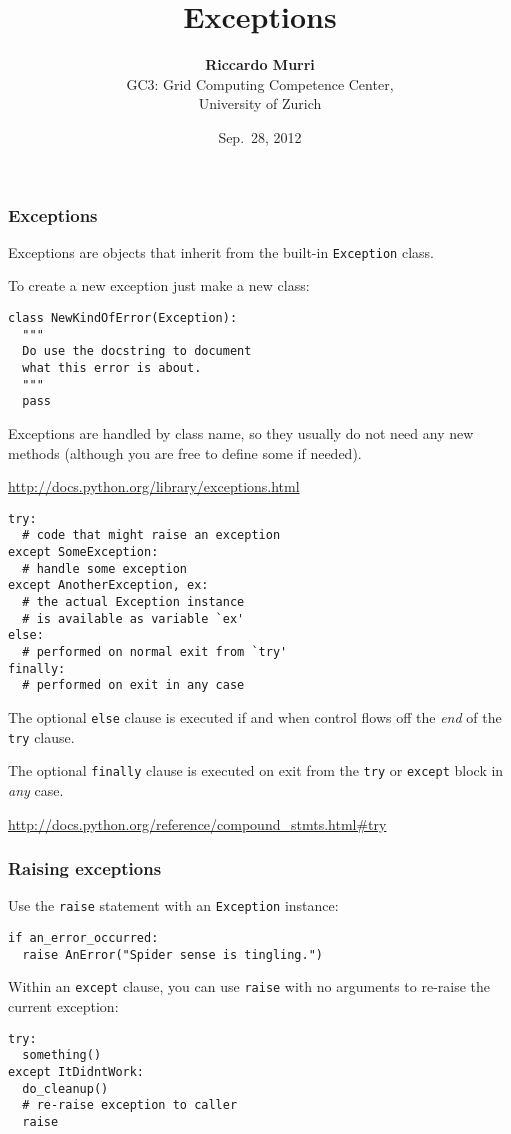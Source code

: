 \documentclass[english,serif,mathserif,xcolor=pdftex,dvipsnames,table]{beamer}
\title[Part 7]{%
  Exceptions
}
\author[R. Murri]{%
  \textbf{Riccardo Murri} \\
  GC3: Grid Computing Competence Center, \\
  University of Zurich
}
\date{Sep.~28, 2012}
\begin{document}
\maketitle


\begin{frame}[fragile]
  \frametitle{Exceptions}

  Exceptions are objects that inherit from the built-in
  \lstinline|Exception| class.

  \+
  To create a new exception just make a new class:
\begin{lstlisting}
class NewKindOfError(Exception):
  """
  Do use the docstring to document 
  what this error is about.
  """
  pass
\end{lstlisting}

  \+
  Exceptions are handled by class name, so they usually do not need
  any new methods (although you are free to define some if needed).

  \begin{seealso}
    \url{http://docs.python.org/library/exceptions.html}
  \end{seealso}
\end{frame}


\begin{frame}[fragile]
\begin{lstlisting}
try:
  # code that might raise an exception
except SomeException:
  # handle some exception
except AnotherException, ex:
  # the actual Exception instance
  # is available as variable `ex'
else:
  # performed on normal exit from `try'
finally:
  # performed on exit in any case
\end{lstlisting}

  \+
  The optional \lstinline|else| clause is executed if and when control flows off the
  \emph{end} of the \lstinline|try| clause.

  \+
  The optional \lstinline|finally| clause is executed on exit from the
  \lstinline|try| or \lstinline|except| block in \emph{any} case.

  \begin{references}
    \scriptsize
    \url{http://docs.python.org/reference/compound_stmts.html#try}
\end{references}
\end{frame}


\begin{frame}[fragile]
  \frametitle{Raising exceptions}
  
  Use the \lstinline|raise| statement with an \texttt{Exception}
  instance:
\begin{lstlisting}
if an_error_occurred:
  raise AnError("Spider sense is tingling.")
\end{lstlisting}

  \+
  Within an \lstinline|except| clause, you can use \lstinline|raise|
  with no arguments to re-raise the current exception:
\begin{lstlisting}
try:
  something()
except ItDidntWork:
  do_cleanup()
  # re-raise exception to caller
  raise
\end{lstlisting}
\end{frame}
\end{document}

